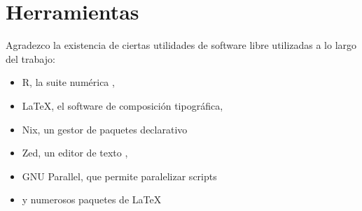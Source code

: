 
\chapter{Herramientas}\label{ap:herramientas}
Agradezco la existencia de ciertas utilidades de software libre utilizadas a lo largo del trabajo:
\begin{itemize}
    \item R, la suite numérica \cite{rlang},
    \item \LaTeX, el software de composición tipográfica,
    \item Nix, un gestor de paquetes declarativo \cite{dolstra_Nix} \cite{dolstra2006nix}
    \item Zed, un editor de texto \cite{zedEditor},
    \item GNU Parallel, que permite paralelizar scripts \cite{gnuParallel}
    \item y numerosos paquetes de \LaTeX
\end{itemize}
